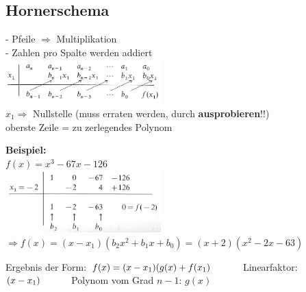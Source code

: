 \begin{flushleft}
		\subsection{Hornerschema}
			\begin{minipage}[t]{9cm}
				- Pfeile $\Rightarrow$ Multiplikation\\
				- Zahlen pro Spalte werden addiert\\
				\includegraphics[width=6cm]{./bilder/Hornerschema_1.png}	\\
				$x_1 \Rightarrow$ Nullstelle (muss erraten werden, durch \textbf{ausprobieren}!!)\\
				oberste Zeile = zu zerlegendes Polynom			
			\end{minipage}
			\begin{minipage}[t]{9cm}
				\textbf{Beispiel:}\\
				$f(x) = x^3-67x-126$\\
				\includegraphics[width=6cm]{./bilder/Hornerschema_2.png}\\
				$\Rightarrow f(x) = (x-x_1)(b_2x^2 + b_1x + b_0) = (x+2)(x^2-2x-63)$	
			\end{minipage}
			Ergebnis der Form: $f(x)=(x-x_1)(g(x)+f(x_1)\hspace*{1cm}$ Linearfaktor: $(x-x_1)\hspace*{1cm}$ Polynom vom Grad $n-1$: $g(x)$ \\
		

\end{flushleft}
